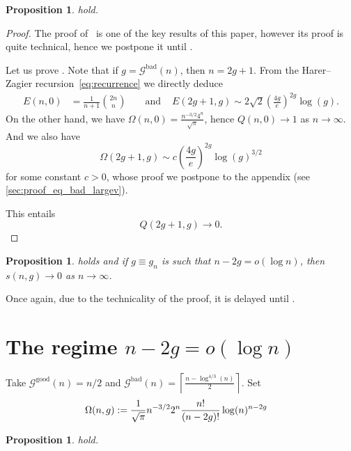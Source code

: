 \documentclass[a4paper,12pt]{article}
\newtheorem{proposition}[theorem]{Proposition}
\theoremstyle{definition}
\newcommand{\nto}{\ensuremath{n\rightarrow\infty}}
\newcommand{\smallv}{\ensuremath{n-2g =o(\log n)}}
\newcommand{\good}[1]{\mathcal{G}^{\text{good}}({#1})}
\newcommand{\goodG}{\good{n}}
\newcommand{\bad}[1]{\mathcal{G}^{\text{bad}}({#1})}
\newcommand{\badG}{\bad{n}}
\newcommand{\badV}{\log^{4/3}(n)}
\begin{document}
\begin{proposition}\label{prop_alpha_beta_largev}
    hold.
\end{proposition}

\begin{proof}
    The proof of~ is one of the key results of this paper, however its proof is quite technical, hence we postpone it until .

Let us prove . Note that if $g=\badG$, then $n=2g+1$. From the Harer--Zagier recursion~\eqref{eq:recurrence} we directly deduce
\begin{align*}
    E(n,0)&=\frac{1}{n+1}\binom{2n}{n} &
    & \text{ and } &
    E(2g+1,g)\sim 2\sqrt{2}\left(\frac{4g}{e}\right)^{2g}\log(g).
\end{align*}
On the other hand, we have $\Omega(n,0)=\frac{n^{-3/2}4^n}{\sqrt{\pi}}$, hence $Q(n,0)\to 1$ as $\nto$. And we also have
\begin{equation}\label{eq_bad_largev}
    \Omega(2g+1,g)\sim c\left(\frac{4g}{e}\right)^{2g}\log(g)^{3/2}
\end{equation}
for some constant $c>0$, 
whose proof we postpone to the appendix (see \cref{sec:proof_eq_bad_largev}).


This entails
\[Q(2g+1,g)\to 0.\]
\end{proof}
\begin{proposition}\label{prop_s_largev}
     holds and if $g\equiv g_n$ is such that $\smallv$, then $s(n,g)\to 0$ as $\nto$.
\end{proposition}

Once again, due to the technicality of the proof, it is delayed until .

\section{The regime $n-2g=o(\log n)$}\label{sec:smallv}
Take $\goodG=n/2$ and $\badG=\left\lceil\frac{n-\badV}{2}\right\rceil$. Set
\begin{align}\label{eq_def_Osmall}
    \Omega(n,g) &:=\frac{1}{\sqrt{\pi}} n^{-3/2} 2^n \frac{n!}{(n-2g)!}\log(n)^{n-2g}
    \notag
\end{align}

\begin{proposition}
    hold.
\end{proposition}
\end{document}
